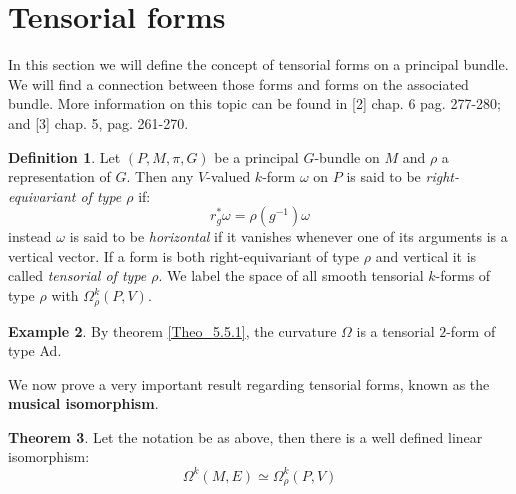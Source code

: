 \documentclass[12pt,a4paper]{report}
\theoremstyle{definition}
\newtheorem{Def}{Definition}[chapter]
\theoremstyle{Theorem}
\newtheorem{Theo}[Def]{Theorem}
\theoremstyle{definition}
\newtheorem{Ex}[Def]{Example}
\theoremstyle{definition}
\begin{document}
	\section{Tensorial forms}
	In this section we will define the concept of tensorial forms on a principal bundle. We will find a connection between those forms and forms on the associated bundle. More information on this topic can be found in [2] chap. 6 pag. 277-280; and [3] chap. 5, pag. 261-270.
	\begin{Def}
		Let $(P,M,\pi,G)$ be a principal $G$-bundle on $M$ and $\rho$ a representation of $G$.  Then any $V$-valued $k$-form $\omega$ on $P$ is said to be \textit{right-equivariant of type $\rho$} if:
		$$r^*_g\omega=\rho(g^{-1})\omega$$
		instead $\omega$ is said to be \textit{horizontal} if it vanishes whenever one of its arguments is a vertical vector. If a form is both right-equivariant of type $\rho$ and vertical it is called \textit{tensorial of type $\rho$}. We label the space of all smooth tensorial $k$-forms of type $\rho$ with $\Omega^k_\rho(P,V)$.
	\end{Def}
	\begin{Ex}
		By theorem \ref{Theo_5.5.1}, the curvature $\Omega$ is a tensorial $2$-form of type Ad.
	\end{Ex}
	We now prove a very important result regarding tensorial forms, known as the \textbf{musical isomorphism}.
	\begin{Theo}\label{Mus_Iso}
		Let the notation be as above, then there is a well defined linear isomorphism:
		$$\Omega^k(M,E)\simeq \Omega^k_\rho(P,V)$$
	\end{Theo}
\end{document}
